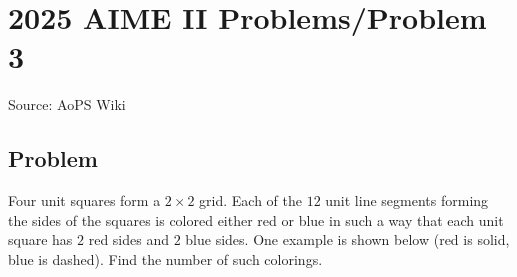 \documentclass[12pt]{article}
\begin{document}
\section*{{2025 AIME II Problems/Problem 3}}
Source: AoPS Wiki

\subsection*{Problem}
Four unit squares form a $2 \times 2$ grid. Each of the $12$ unit line segments forming the sides of the squares is colored either red or blue in such a way that each unit square has $2$ red sides and $2$ blue sides. One example is shown below (red is solid, blue is dashed). Find the number of such colorings.
\end{document}
